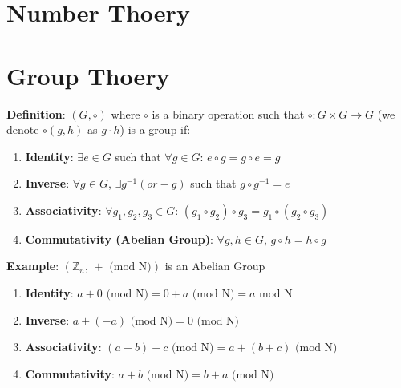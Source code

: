 \documentclass{scribe}
\begin{document}
\maketitle


\section{Number Thoery}


\section{Group Thoery}

\textbf{Definition}: $(G,\circ)$ where $\circ$ is a binary operation such that $\circ:G \times G \rightarrow G$ (we denote $\circ(g,h)$ as $g \cdot h$) is a group if:

\begin{enumerate}
    \item \textbf{Identity}: $\exists e \in G$ such that $\forall g \in G$: $e \circ g = g \circ e = g$
    \item \textbf{Inverse}: $\forall g \in G$, $\exists g^{-1} (or -g)$ such that $g \circ g^{-1} = e$
    \item \textbf{Associativity}: $\forall g_1, g_2, g_3 \in G$: $(g_1 \circ g_2) \circ g_3 = g_1 \circ (g_2 \circ g_3)$
    \item \textbf{Commutativity (Abelian Group)}: $\forall g,h \in G$, $g \circ h = h \circ g$
\end{enumerate}

\noindent\textbf{Example}: $(\mathbb{Z}_n \text{, } + \text{ (mod N)})$ is an Abelian Group
\begin{enumerate}
    \item \textbf{Identity}: $ a + 0 \text{ (mod N)} = 0 + a \text{ (mod N)} = a \text{ mod N}$
    \item \textbf{Inverse}: $a+ (-a) \text{ (mod N)} = 0 \text{ (mod N)}$
    \item \textbf{Associativity}: $(a+b)+c \text{ (mod N)} = a+(b+c) \text{ (mod N)} $
    \item \textbf{Commutativity}: $a+b \text{ (mod N)} = b+a \text{ (mod N)}$
\end{enumerate}
\end{document}
